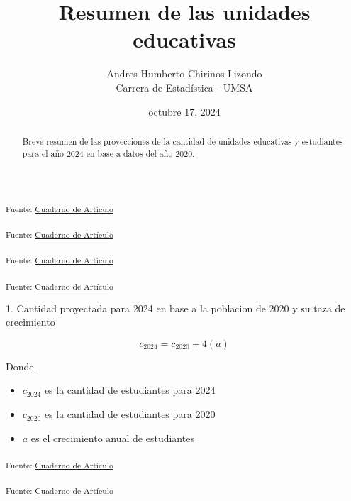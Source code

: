 \documentclass[
  12pt]{article}
\begin{document}
\def\spacingset#1{\renewcommand{\baselinestretch}%
{#1}\small\normalsize} \spacingset{1}



\date{octubre 17, 2024}
\title{\bf Resumen de las unidades educativas}
\author{
Andres Humberto Chirinos Lizondo\\
Carrera de Estadística - UMSA\\
}
\maketitle

\bigskip
\bigskip
\begin{abstract}
Breve resumen de las proyecciones de la cantidad de unidades educativas
y estudiantes para el año 2024 en base a datos del año 2020.
\end{abstract}


\newpage
\spacingset{1.9} %


\textsubscript{Fuente: \href{sociest.org/index.ipynb.html}{Cuaderno de
Artículo}}

\textsubscript{Fuente: \href{sociest.org/index.ipynb.html}{Cuaderno de
Artículo}}

\textsubscript{Fuente: \href{sociest.org/index.ipynb.html}{Cuaderno de
Artículo}}

\textsubscript{Fuente: \href{sociest.org/index.ipynb.html}{Cuaderno de
Artículo}}

1. Cantidad proyectada para 2024 en base a la poblacion de 2020 y su
taza de crecimiento

\[
c_{2024} = c_{2020} + 4(a)
\]

Donde.

\begin{itemize}
\item
  \(c_{2024}\) es la cantidad de estudiantes para 2024
\item
  \(c_{2020}\) es la cantidad de estudiantes para 2020
\item
  \(a\) es el crecimiento anual de estudiantes
\end{itemize}

\textsubscript{Fuente: \href{sociest.org/index.ipynb.html}{Cuaderno de
Artículo}}

\textsubscript{Fuente: \href{sociest.org/index.ipynb.html}{Cuaderno de
Artículo}}
\end{document}
